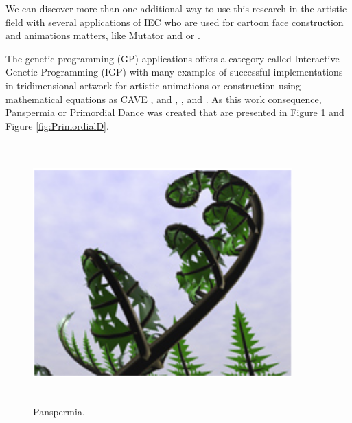 We can discover more than one additional way to use this research in the
artistic field with several applications of IEC who are used for cartoon face
construction and animations matters, like Mutator \cite{todd1994evolutionary}
and \cite{todd1999mutation} or \cite{bentley1999introduction}.

The genetic programming (GP) applications offers a category called Interactive
Genetic Programming (IGP) with many examples of successful implementations in
tridimensional artwork for artistic animations or construction using
mathematical equations as CAVE \cite{das1994genetic}, \cite{papka1996ubiworld}
and \cite{disz1997ubiworld}, \cite{sims1991artificial},
\cite{sims1992interactive} and \cite{min2004creative}. As this work consequence,
Panspermia or Primordial Dance was created that are presented in Figure
\ref{fig:Panspermia} and Figure \ref{fig:PrimordialD}.

\begin{figure}
\captionsetup{justification=centering,margin=2cm}
\centering
\setlength\fboxsep{0pt}
\setlength\fboxrule{0.7pt}
\includegraphics[width=10cm,height=10cm,keepaspectratio]{img/Panspermia.png}
\caption{Panspermia.}
\label{fig:Panspermia}
\end{figure}

